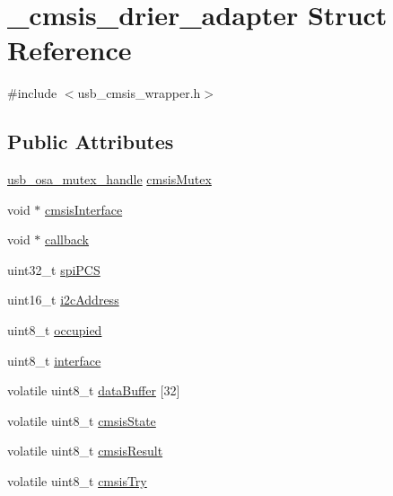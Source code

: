 \hypertarget{struct__cmsis__drier__adapter}{\section{\-\_\-cmsis\-\_\-drier\-\_\-adapter Struct Reference}
\label{struct__cmsis__drier__adapter}
}


{\ttfamily \#include $<$usb\-\_\-cmsis\-\_\-wrapper.\-h$>$}

\subsection*{Public Attributes}
\begin{DoxyCompactItemize}
\item 
\hyperlink{group__usb__os__abstraction_gad259d0dfe125b11cccaf93163ef915fd}{usb\-\_\-osa\-\_\-mutex\-\_\-handle} \hyperlink{struct__cmsis__drier__adapter_a952d05d8262ef9aebfa6ca9c4d62fe46}{cmsis\-Mutex}
\item 
void $\ast$ \hyperlink{struct__cmsis__drier__adapter_a41bdda4fa1a6cae13f89934bf67c7449}{cmsis\-Interface}
\item 
void $\ast$ \hyperlink{struct__cmsis__drier__adapter_a3d93d5a2f3f34c0064bfbe5a4cf093a0}{callback}
\item 
uint32\-\_\-t \hyperlink{struct__cmsis__drier__adapter_ac81cbf4cbf2ee30a3f3a74b39a6d8780}{spi\-P\-C\-S}
\item 
uint16\-\_\-t \hyperlink{struct__cmsis__drier__adapter_ab9edc386a490908a453990755f01c77b}{i2c\-Address}
\item 
uint8\-\_\-t \hyperlink{struct__cmsis__drier__adapter_ad4d980a94b8a1c3d88331a2577435db4}{occupied}
\item 
uint8\-\_\-t \hyperlink{struct__cmsis__drier__adapter_a51a572fa7a648387cf481b45b862457c}{interface}
\item 
volatile uint8\-\_\-t \hyperlink{struct__cmsis__drier__adapter_a262a2f72787adfa5fddbb085c9428feb}{data\-Buffer} \mbox{[}32\mbox{]}
\item 
volatile uint8\-\_\-t \hyperlink{struct__cmsis__drier__adapter_afcd5fc386d2b9d3c3ba425e8360f741b}{cmsis\-State}
\item 
volatile uint8\-\_\-t \hyperlink{struct__cmsis__drier__adapter_a4197e11173243ee2211120a5073ea53a}{cmsis\-Result}
\item 
volatile uint8\-\_\-t \hyperlink{struct__cmsis__drier__adapter_ad8a1c951411d7534456c822924622806}{cmsis\-Try}
\end{DoxyCompactItemize}


